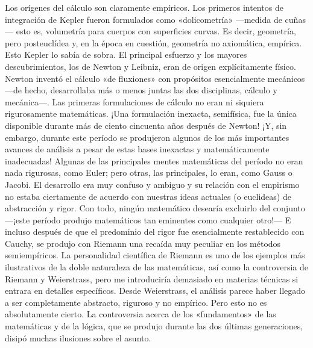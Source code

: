 \documentclass[a4paper, 12pt]{article}
\begin{document}
Los orígenes del cálculo son claramente empíricos. Los primeros intentos de integración de Kepler fueron formulados como «dolicometría» ---medida de cuñas--- esto es, volumetría para cuerpos con superficies curvas. Es decir, geometría, pero posteuclídea y, en la época en cuestión, geometría no axiomática, empírica. Esto Kepler lo sabía de sobra. El principal esfuerzo y los mayores descubrimientos, los de Newton y Leibniz, eran de origen explícitamente físico. Newton inventó el cálculo «de fluxiones» con propósitos esencialmente mecánicos ---de hecho, desarrollaba más o menos juntas las dos disciplinas, cálculo y mecánica---. Las primeras formulaciones de cálculo no eran ni siquiera rigurosamente matemáticas. ¡Una formulación inexacta, semifísica, fue la única disponible durante más de ciento cincuenta años después de Newton! ¡Y, sin embargo, durante este período se produjeron algunos de los más importantes avances de análisis a pesar de estas bases inexactas y matemáticamente inadecuadas! Algunas de las principales mentes matemáticas del período no eran nada rigurosas, como Euler; pero otras, las principales, lo eran, como Gauss o Jacobi. El desarrollo era muy confuso y ambiguo y su relación con el empirismo no estaba ciertamente de acuerdo con nuestras ideas actuales (o euclideas) de abstracción y rigor. Con todo, ningún matemático desearía excluirlo del conjunto ---¡este período produjo matemáticos tan eminentes como cualquier otro!--- E incluso después de que el predominio del rigor fue esencialmente restablecido con Cauchy, se produjo con Riemann una recaída muy peculiar en los métodos semiempíricos. La personalidad científica de Riemann es uno de los ejemplos más ilustrativos de la doble naturaleza de las matemáticas, así como la controversia de Riemann y Weierstrass, pero me introduciría demasiado en materias técnicas si entrara en detalles específicos. Desde Weierstrass, el análisis parece haber llegado a ser completamente abstracto, riguroso y no empírico. Pero esto no es absolutamente cierto. La controversia acerca de los «fundamentos» de las matemáticas y de la lógica, que se produjo durante las dos últimas generaciones, disipó muchas ilusiones sobre el asunto.
\end{document}

